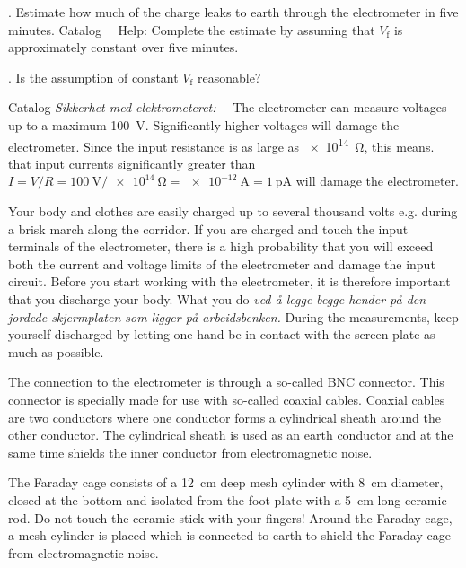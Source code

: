 \documentclass[../Elmag-labhefte-2022.tex]{subfiles}
\begin{document}
{. Estimate how much of the charge leaks to earth through the electrometer in five minutes.}
Catalog \ \
Help: Complete the estimate by assuming that $V_\text{f}$ is approximately constant over five minutes.

{. Is the assumption of constant $V_\text{f}$ reasonable?}

Catalog \emph{Sikkerhet med elektrometeret:} \ \
The electrometer can measure voltages up to a maximum \SI{100}{\volt}. Significantly higher voltages will damage the electrometer. Since the input resistance is as large as \SI{e14}{\ohm}, this means. that input currents significantly greater than $I = V/R = \SI{100}{\volt} / \SI{e14}{\ohm} = \SI{e-12}{\ampere} = \SI{1}{\pico\ampere}$ will damage the electrometer.

Your body and clothes are easily charged up to several thousand volts e.g. during a brisk march along the corridor. If you are charged and touch the input terminals of the electrometer, there is a high probability that you will exceed both the current and voltage limits of the electrometer and damage the input circuit. Before you start working with the electrometer, it is therefore important that you discharge your body. What you do \emph{ved å legge begge hender på den jordede skjermplaten som ligger på arbeidsbenken.} During the measurements, keep yourself discharged by letting one hand be in contact with the screen plate as much as possible.

The connection to the electrometer is through a so-called BNC connector. This connector is specially made for use with so-called coaxial cables. Coaxial cables are two conductors where one conductor forms a cylindrical sheath around the other conductor. The cylindrical sheath is used as an earth conductor and at the same time shields the inner conductor from electromagnetic noise.


The Faraday cage consists of a \SI{12}{\cm} deep mesh cylinder with \SI{8}{\cm} diameter, closed at the bottom and isolated from the foot plate with a \SI{5}{\cm} long ceramic rod. Do not touch the ceramic stick with your fingers! Around the Faraday cage, a mesh cylinder is placed which is connected to earth to shield the Faraday cage from electromagnetic noise.
\end{document}
